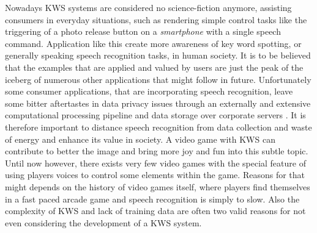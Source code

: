 

Nowadays KWS systems are considered no science-fiction anymore, assisting consumers in everyday situations, such as rendering simple control tasks like the triggering of a photo release button on a \emph{smartphone} with a single speech command.
Application like this create more awareness of key word spotting, or generally speaking speech recognition tasks, in human society.
It is to be believed that the examples that are applied and valued by users are just the peak of the iceberg of numerous other applications that might follow in future.
Unfortunately some consumer applications, that are incorporating speech recognition, leave some bitter aftertastes in data privacy issues through an externally and extensive computational processing pipeline and data storage over corporate servers \cite{Tang2018}.
It is therefore important to distance speech recognition from data collection and waste of energy and enhance its value in society.
A video game with KWS can contribute to better the image and bring more joy and fun into this subtle topic.
Until now however, there exists very few video games with the special feature of using players voices to control some elements within the game.
Reasons for that might depends on the history of video games itself, where players find themselves in a fast paced arcade game and speech recognition is simply to slow.
Also the complexity of KWS and lack of training data are often two valid reasons for not even considering the development of a KWS system.

